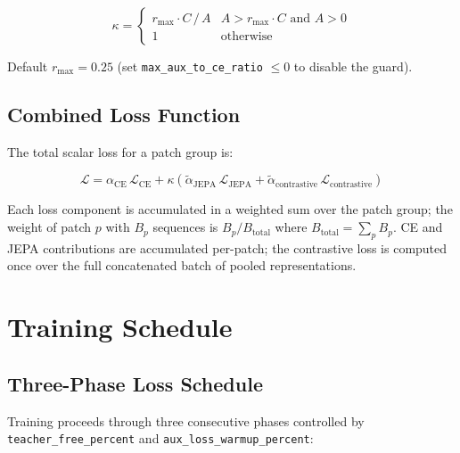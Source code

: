 \documentclass[11pt,a4paper]{article}
\begin{document}
\begin{equation}
  \kappa =
  \begin{cases}
    r_{\max} \cdot C \,/\, A & A > r_{\max} \cdot C \text{ and } A > 0 \\
    1 & \text{otherwise}
  \end{cases}
\end{equation}

Default $r_{\max} = 0.25$ (set \texttt{max\_aux\_to\_ce\_ratio} $\le 0$ to disable the guard).

\subsection{Combined Loss Function}

The total scalar loss for a patch group is:

\begin{equation}
  \boxed{
    \mathcal{L} =
    \alpha_{\mathrm{CE}}\,\mathcal{L}_{\mathrm{CE}}
    + \kappa\!\left(\tilde\alpha_{\mathrm{JEPA}}\,\mathcal{L}_{\mathrm{JEPA}}
                  + \tilde\alpha_{\mathrm{contrastive}}\,\mathcal{L}_{\mathrm{contrastive}}\right)
  }
\end{equation}

Each loss component is accumulated in a weighted sum over the patch group; the weight of patch $p$
with $B_p$ sequences is $B_p / B_{\mathrm{total}}$ where $B_{\mathrm{total}} = \sum_p B_p$.
CE and JEPA contributions are accumulated per-patch; the contrastive loss is computed once over the
full concatenated batch of pooled representations.

\section{Training Schedule}

\subsection{Three-Phase Loss Schedule}

Training proceeds through three consecutive phases controlled by \texttt{teacher\_free\_percent}
and \texttt{aux\_loss\_warmup\_percent}:
\end{document}
